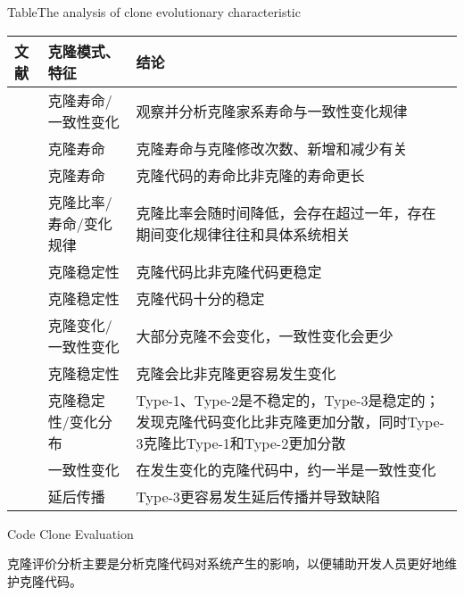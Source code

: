 
\begin{table}[htbp]
\centering
{}
{Table$\!$}{The analysis of clone evolutionary characteristic}
\vspace{0.5em}
\wuhao
\begin{tabularx}{0.9\textwidth}{llX}
\toprule[1.5pt]
文献&克隆模式、特征&结论\\
\midrule[1pt]
\cite{kim2005empirical}&	克隆寿命/一致性变化	&观察并分析克隆家系寿命与一致性变化规律\\
\cite{cai2011empirical}&	克隆寿命&	克隆寿命与克隆修改次数、新增和减少有关\\
\cite{krinke2011cloned}&	克隆寿命&	克隆代码的寿命比非克隆的寿命更长\\
\cite{bazrafshan2012evolution}\cite{gode2009evolution}&	克隆比率/寿命/变化规律	&克隆比率会随时间降低，会存在超过一年，存在期间变化规律往往和具体系统相关\\
\hline
\cite{krinke2008cloned}&克隆稳定性&	克隆代码比非克隆代码更稳定\\
\cite{gode2011clone}\cite{harder2013cloned}&	克隆稳定性&	克隆代码十分的稳定\\
\cite{gode2011frequency}&	克隆变化/一致性变化&	大部分克隆不会变化，一致性变化会更少\\
\cite{rahman2014change}&	克隆稳定性&	克隆会比非克隆更容易发生变化\\
\cite{mondal2012comparative}\cite{mondal2012dispersion}&	克隆稳定性/变化分布&	Type-1、Type-2是不稳定的，Type-3是稳定的；发现克隆代码变化比非克隆更加分散，同时Type-3克隆比Type-1和Type-2更加分散\\
\hline
\cite{krinke2007study}&	一致性变化&	在发生变化的克隆代码中，约一半是一致性变化\\
\cite{barbour2011late}\cite{mondal2016comparative}&	延后传播&	Type-3更容易发生延后传播并导致缺陷\\
\bottomrule[1.5pt]
\end{tabularx}
\end{table}

{Code Clone Evaluation}

克隆评价分析主要是分析克隆代码对系统产生的影响，以便辅助开发人员更好地维护克隆代码。%

